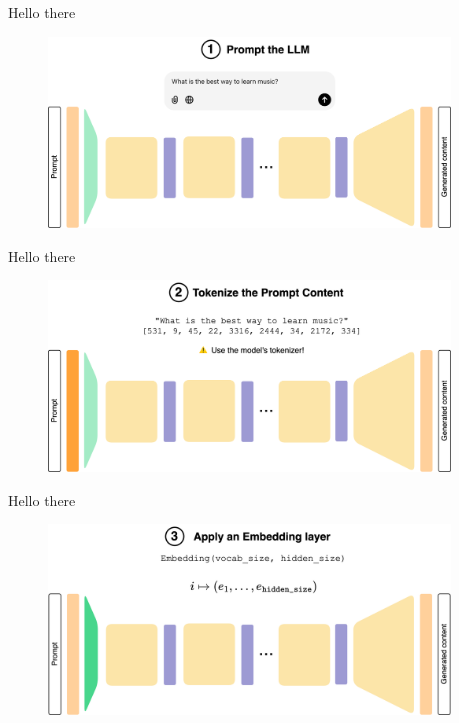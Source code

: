\documentclass[11pt,aspectratio=169]{beamer}
\begin{document}
\begin{frame}{Hello there}
    \begin{figure}
        \centering
        \includegraphics[width=0.95\textwidth]{llm_1.png}
    \end{figure}
\end{frame}

\begin{frame}{Hello there}
    \begin{figure}
        \centering
        \includegraphics[width=0.95\textwidth]{llm_2.png}
    \end{figure}
\end{frame}

\begin{frame}{Hello there}
    \begin{figure}
        \centering
        \includegraphics[width=0.95\textwidth]{llm_3.png}
    \end{figure}
\end{frame}
\end{document}
